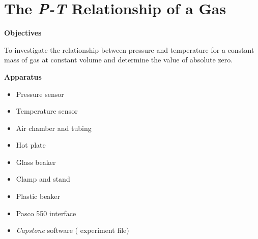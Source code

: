
\section{The \textit{P-T} Relationship of a Gas}

\makelabheader %

\bigskip
\textbf{Objectives} 

To investigate the relationship between pressure and temperature for
a constant mass of gas at constant volume and determine the value
of absolute zero.

\bigskip

\textbf{Apparatus} 

\begin{itemize}[nosep]
\item Pressure sensor
\item Temperature sensor
\item Air chamber and tubing
\item Hot plate
\item Glass beaker
\item Clamp and stand
\item Plastic beaker
\item Pasco 550 interface
\item \textit{Capstone} software ( experiment file)
\end{itemize}
\vspace{0.3cm}

